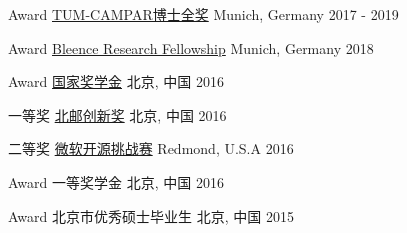 




\begin{cvhonors}

\cvhonor
{Award} %
{\href{}{TUM-CAMPAR博士全奖} } %
{Munich, Germany} %
{2017 - 2019} %

\cvhonor
{Award} %
{\href{https://bleenco.com/}{Bleence Research Fellowship} } %
{Munich, Germany} %
{2018} %

\cvhonor
{Award} %
{\href{http://sice.bupt.edu.cn/info/1008/1546.htm}{国家奖学金}} %
{北京, 中国} %
{2016} %

\cvhonor
{一等奖} %
{\href{http://my.bupt.edu.cn/detach.portal?.pmn=view&action=browser&.ia=false&.pen=pe1144&bulletinId=fc089be9-6d81-11e6-ae27-4f4915a784ea}{北邮创新奖}} %
{北京, 中国} %
{2016} %


\cvhonor
{二等奖} %
{\href{https://www.microsoft.com/en-us/research/academic-program/microsoft-open-source-challenge/}{微软开源挑战赛}} %
{Redmond, U.S.A} %
{2016} %


\cvhonor
{Award} %
{一等奖学金} %
{北京, 中国} %
{2016} %

\cvhonor
{Award} %
{北京市优秀硕士毕业生} %
{北京, 中国} %
{2015} %



\end{cvhonors}
